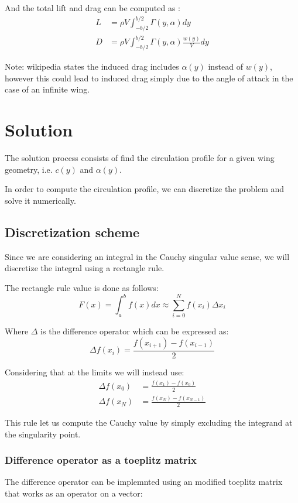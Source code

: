 And the total lift and drag can be computed as \cite[eqn 22]{leishman}:
\begin{align}
    L &= \rho V  \int_{-b/2}^{b/2} \Gamma(y, \alpha) dy \\
    D &= \rho V \int_{-b/2}^{b/2} \Gamma(y, \alpha) \frac{w(y)}{V} dy
\end{align}

Note: wikipedia states the induced drag includes $\alpha(y)$ instead of $w(y)$, however this could lead to induced drag simply due to the angle of attack in the case of an infinite wing.

\section{Solution}
The solution process consists of find the circulation profile for a given wing geometry, i.e. $c(y)$ and $\alpha(y)$.

In order to compute the circulation profile, we can discretize the problem and solve it numerically.

\subsection{Discretization scheme}
Since we are considering an integral in the Cauchy singular value sense, we will discretize the integral using a rectangle rule.

The rectangle rule value is done as follows:
\begin{equation}
    F(x) = \int_{a}^{b} f(x) dx \approx \sum_{i=0}^{N} f(x_i) \Delta x_i
\end{equation}

Where $\Delta$ is the difference operator which can be expressed as:
\begin{equation}
    \Delta f(x_i) = \frac{f(x_{i+1}) - f(x_{i-1})}{2}
\end{equation}

Considering that at the limits we will instead use:
\begin{align}
    \Delta f(x_0) &= \frac{f(x_1) - f(x_0)}{2} \\
    \Delta f(x_N) &= \frac{f(x_N) - f(x_{N-1})}{2}
\end{align}

This rule let us compute the Cauchy value by simply excluding the integrand at the singularity point.

\subsubsection{Difference operator as a toeplitz matrix}
The difference operator can be implemnted using an modified toeplitz matrix that works as an operator on a vector:

